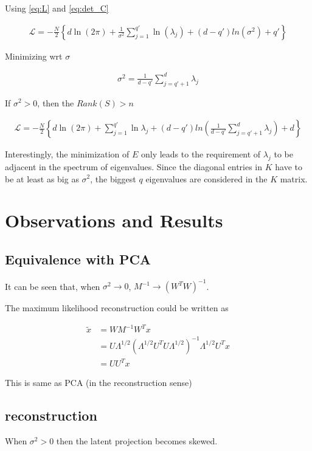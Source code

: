 \documentclass[10pt,onecolumn,letterpaper]{article}
\begin{document}
Using \eqref{eq:L} and \eqref{eq:det_C}

\begin{align}
    \mathcal{L} = -\frac{N}{2}\left\{d \ln(2\pi)+\frac{1}{\sigma^2}\sum_{j=1}^{q'}\ln(\lambda_j)+(d-q')ln(\sigma^2)+q' \right\}
\end{align}

Minimizing wrt $\sigma$

\begin{align}
\sigma^2=\frac{1}{d-q'}\sum_{j=q'+1}^{d}\lambda_j
\end{align}


If $\sigma^2>0$, then the $Rank(S)>n$

\begin{align}
    \mathcal{L} = -\frac{N}{2}\left\{d \ln(2\pi)+\sum_{j=1}^{q'}\ln\lambda_j+(d-q')ln\left(\frac{1}{d-q'}\sum_{j=q'+1}^{d}\lambda_j\right)+d \right\}
\end{align}


Interestingly, the minimization of $E$ only leads to the requirement of $\lambda_j$ to be adjacent in the spectrum of eigenvalues. Since the diagonal entries in $K$ have to be at least as big as $\sigma^2$, the biggest $q$ eigenvalues are considered in the $K$ matrix.

\section{Observations and Results}

\subsection{Equivalence with PCA}
It can be seen that, when $\sigma^2 \rightarrow 0$, $M^{-1}\rightarrow(W^TW)^{-1}$.

The maximum likelihood reconstruction could be written as

\begin{align}
\tilde x &= WM^{-1}W^Tx\\
&= U\Lambda^{1/2}(\Lambda^{1/2}U^TU\Lambda^{1/2})^{-1}\Lambda^{1/2}U^Tx\\
&= UU^Tx
\end{align}

This is same as PCA (in the reconstruction sense)

\subsection{reconstruction}
When $\sigma^2 > 0$ then the latent projection becomes skewed.
\end{document}
